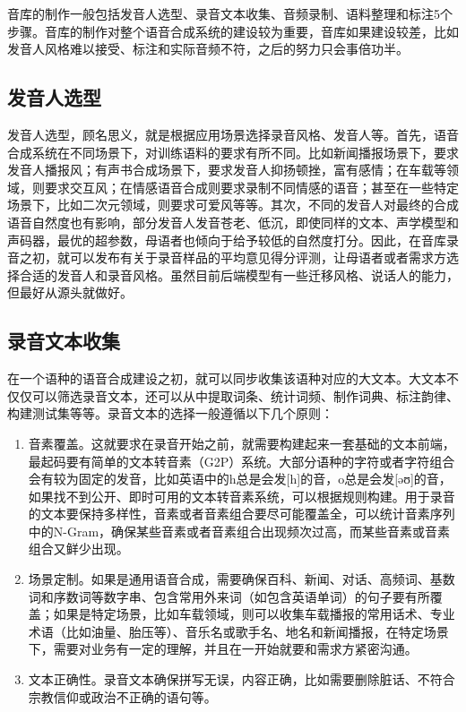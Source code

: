 \documentclass[cn,10pt,math=newtx,citestyle=gb7714-2015,bibstyle=gb7714-2015]{elegantbook}
\begin{document}
音库的制作一般包括发音人选型、录音文本收集、音频录制、语料整理和标注5个步骤。音库的制作对整个语音合成系统的建设较为重要，音库如果建设较差，比如发音人风格难以接受、标注和实际音频不符，之后的努力只会事倍功半。

\subsection{发音人选型}

发音人选型，顾名思义，就是根据应用场景选择录音风格、发音人等。首先，语音合成系统在不同场景下，对训练语料的要求有所不同。比如新闻播报场景下，要求发音人播报风；有声书合成场景下，要求发音人抑扬顿挫，富有感情；在车载等领域，则要求交互风；在情感语音合成则要求录制不同情感的语音；甚至在一些特定场景下，比如二次元领域，则要求可爱风等等。其次，不同的发音人对最终的合成语音自然度也有影响，部分发音人发音苍老、低沉，即使同样的文本、声学模型和声码器，最优的超参数，母语者也倾向于给予较低的自然度打分。因此，在音库录音之初，就可以发布有关于录音样品的平均意见得分评测，让母语者或者需求方选择合适的发音人和录音风格。虽然目前后端模型有一些迁移风格、说话人的能力，但最好从源头就做好。

\subsection{录音文本收集}

在一个语种的语音合成建设之初，就可以同步收集该语种对应的大文本。大文本不仅仅可以筛选录音文本，还可以从中提取词条、统计词频、制作词典、标注韵律、构建测试集等等。录音文本的选择一般遵循以下几个原则：

\begin{enumerate}
  \item 音素覆盖。这就要求在录音开始之前，就需要构建起来一套基础的文本前端，最起码要有简单的文本转音素（G2P）系统。大部分语种的字符或者字符组合会有较为固定的发音，比如英语中的h总是会发[h]的音，o总是会发[əʊ]的音，如果找不到公开、即时可用的文本转音素系统，可以根据规则构建。用于录音的文本要保持多样性，音素或者音素组合要尽可能覆盖全，可以统计音素序列中的N-Gram，确保某些音素或者音素组合出现频次过高，而某些音素或音素组合又鲜少出现。
  \item 场景定制。如果是通用语音合成，需要确保百科、新闻、对话、高频词、基数词和序数词等数字串、包含常用外来词（如包含英语单词）的句子要有所覆盖；如果是特定场景，比如车载领域，则可以收集车载播报的常用话术、专业术语（比如油量、胎压等）、音乐名或歌手名、地名和新闻播报，在特定场景下，需要对业务有一定的理解，并且在一开始就要和需求方紧密沟通。
  \item 文本正确性。录音文本确保拼写无误，内容正确，比如需要删除脏话、不符合宗教信仰或政治不正确的语句等。
\end{enumerate}
\end{document}

